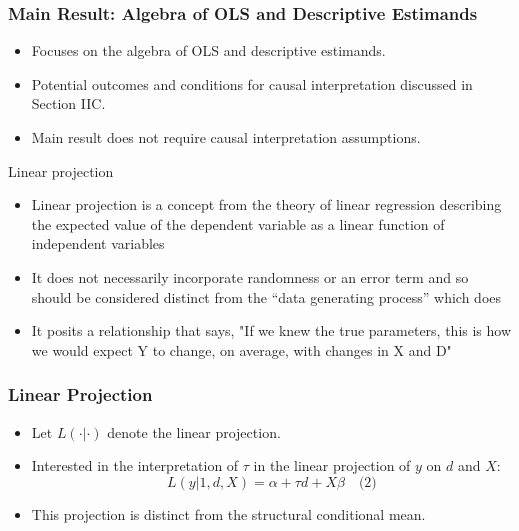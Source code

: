 \begin{frame}
\frametitle{Main Result: Algebra of OLS and Descriptive Estimands}
\begin{itemize}
    \item Focuses on the algebra of OLS and descriptive estimands.
    \item Potential outcomes and conditions for causal interpretation discussed in Section IIC.
    \item Main result does not require causal interpretation assumptions.
\end{itemize}
\end{frame}

\begin{frame}{Linear projection}

\begin{itemize}
\item Linear projection is a concept from the theory of linear regression describing the expected value of the dependent variable as a linear function of independent variables 
\item It does not necessarily incorporate randomness or an error term and so should be considered distinct from the ``data generating process'' which does
\item It posits a relationship that says, "If we knew the true parameters, this is how we would expect Y to change, on average, with changes in X and D"
\end{itemize}

\end{frame}

\begin{frame}
\frametitle{Linear Projection}
\begin{itemize}
    \item Let \( L(\cdot | \cdot) \) denote the linear projection.
    \item Interested in the interpretation of \( \tau \) in the linear projection of \( y \) on \( d \) and \( X \):
    \[ L(y | 1, d, X) = \alpha + \tau d + X\beta \quad \text{(2)} \]
    \item This projection is distinct from the structural conditional mean.
\end{itemize}
\end{frame}

